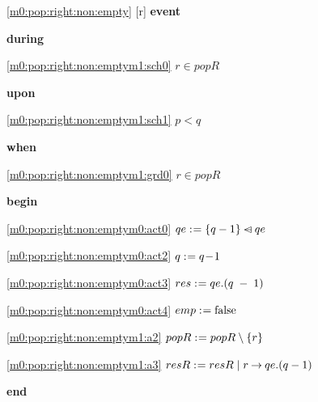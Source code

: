 \noindent \ref{m0:pop:right:non:empty} [r] \textbf{event}
\begin{block}
  \item   \textbf{during}
  \begin{block}
  \item[ \eqref{m0:pop:right:non:emptym1:sch0} ]$r \in popR $ %
  \end{block}
  \item   \textbf{upon}
  \begin{block}
  \item[ \eqref{m0:pop:right:non:emptym1:sch1} ]$p < q $ %
  \end{block}
  \item   \textbf{when}
  \begin{block}
  \item[ \eqref{m0:pop:right:non:emptym1:grd0} ]$r \in popR $ %
  \end{block}
  \item   \textbf{begin}
  \begin{block}
  \item[ \eqref{m0:pop:right:non:emptym0:act0} ]$qe \mathrel{:\mkern1mu=} \{ q-1 \} \mathbin{\lhd\mkern-14mu-} qe $ %
  \item[ \eqref{m0:pop:right:non:emptym0:act2} ]$q \mathrel{:\mkern1mu=} q\! - \!1 $ %
  \item[ \eqref{m0:pop:right:non:emptym0:act3} ]$res \mathrel{:\mkern1mu=} qe.(q\; - \;1) $ %
  \item[ \eqref{m0:pop:right:non:emptym0:act4} ]$emp \mathrel{:\mkern1mu=} \text{false} $ %
  \item[ \eqref{m0:pop:right:non:emptym1:a2} ]$popR \mathrel{:\mkern1mu=} popR \setminus \{ r \} $ %
  \item[ \eqref{m0:pop:right:non:emptym1:a3} ]$resR \mathrel{:\mkern1mu=} resR \; | \; r \mathbin\rightarrow qe.(q-1) $ %
  \end{block}
  \item   \textbf{end} \\
\end{block}
